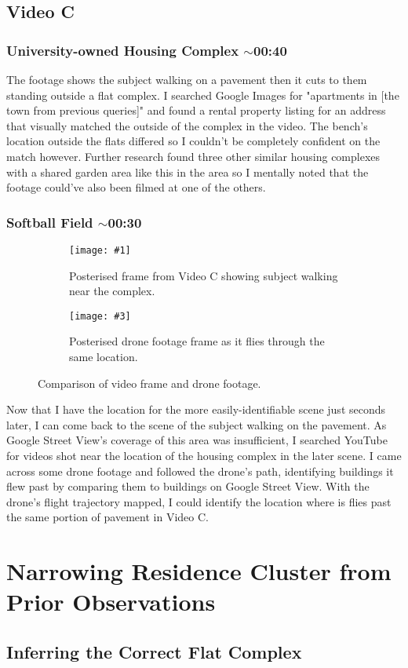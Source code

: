 \documentclass[a4paper,11pt]{report}
\newcommand{\comparison}[5] {
    \begin{figure}[htbp]
        \centering
        
        \begin{subfigure}[t]{0.45\textwidth}
            \centering
            \texttt{[image: \#1]}
            \caption{#2}
        \end{subfigure}
        \hfill
        \begin{subfigure}[t]{0.45\textwidth}
            \centering
            \texttt{[image: \#3]}
            \caption{#4}
        \end{subfigure}
    
        \caption{#5}
    \end{figure}
}
\begin{document}
\subsection{Video C}

\subsubsection{University-owned Housing Complex $\sim$00:40}

The footage shows the subject walking on a pavement then it cuts to them standing outside a flat complex. I searched Google Images for "apartments in [the town from previous queries]" and found a rental property listing for an address that visually matched the outside of the complex in the video. The bench's location outside the flats differed so I couldn’t be completely confident on the match however. Further research found three other similar housing complexes with a shared garden area like this in the area so I mentally noted that the footage could've also been filmed at one of the others.

\subsubsection{Softball Field $\sim$00:30}

\comparison
    {images/pavement-video.png}
    {Posterised frame from Video C showing subject walking near the complex.}
    {images/pavement-drone.png}
    {Posterised drone footage frame as it flies through the same location.}
    {Comparison of video frame and drone footage.}

Now that I have the location for the more easily-identifiable scene just seconds later, I can come back to the scene of the subject walking on the pavement. As Google Street View's coverage of this area was insufficient, I searched YouTube for videos shot near the location of the housing complex in the later scene. I came across some drone footage and followed the drone's path, identifying buildings it flew past by comparing them to buildings on Google Street View. With the drone's flight trajectory mapped, I could identify the location where is flies past the same portion of pavement in Video C.

\section{Narrowing Residence Cluster from Prior Observations}

\subsection{Inferring the Correct Flat Complex}
\end{document}

